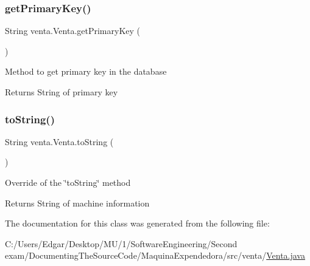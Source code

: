 \subsubsection{\texorpdfstring{get\+Primary\+Key()}{getPrimaryKey()}}
{\footnotesize\ttfamily String venta.\+Venta.\+get\+Primary\+Key (\begin{DoxyParamCaption}{ }\end{DoxyParamCaption})\hspace{0.3cm}{\ttfamily [inline]}}

Method to get primary key in the database

\begin{DoxyReturn}{Returns}
String of primary key 
\end{DoxyReturn}
\mbox{\label{classventa_1_1_venta_afc2a44f382c68fb42c3a04f4e4890b29}} 
\subsubsection{\texorpdfstring{to\+String()}{toString()}}
{\footnotesize\ttfamily String venta.\+Venta.\+to\+String (\begin{DoxyParamCaption}{ }\end{DoxyParamCaption})\hspace{0.3cm}{\ttfamily [inline]}}

Override of the \char`\"{}to\+String\char`\"{} method \begin{DoxyReturn}{Returns}
String of machine information 
\end{DoxyReturn}


The documentation for this class was generated from the following file\+:\begin{DoxyCompactItemize}
\item 
C\+:/\+Users/\+Edgar/\+Desktop/\+M\+U/1/\+Software\+Engineering/\+Second exam/\+Documenting\+The\+Source\+Code/\+Maquina\+Expendedora/src/venta/\mbox{\hyperlink{_venta_8java}{Venta.\+java}}\end{DoxyCompactItemize}
